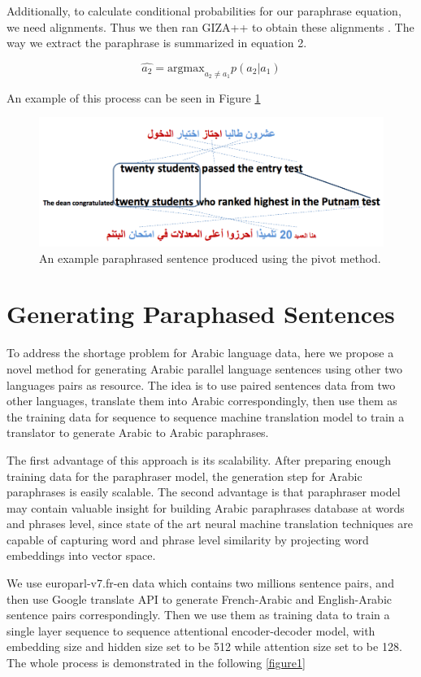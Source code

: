 \documentclass[11pt,letterpaper]{article}
\begin{document}
Additionally, to calculate conditional probabilities for our paraphrase equation, we need alignments. Thus we then ran GIZA++ to obtain these alignments \cite{och03:asc}. The way we extract the paraphrase is summarized in equation 2. 

\begin{equation}
\hat{a_2} = \text{argmax}_{a_2 \neq a_1} p(a_2 | a_1)
\end{equation}

An example of this process can be seen in Figure \ref{fig:pivot}
\begin{figure}
\includegraphics[scale=0.5]{arabic_pivot}
\caption{An example paraphrased sentence produced using the pivot method. }
\label{fig:pivot}
\end{figure}
\section{Generating Paraphased Sentences}
	To address the shortage problem for Arabic language data, here we propose a novel method for generating Arabic parallel language sentences using other two languages pairs as resource. The idea is to use paired sentences data from two other languages, translate them into Arabic correspondingly, then use them as the  training data for sequence to sequence machine translation model to train a translator  to generate Arabic to Arabic paraphrases.
  
	The first advantage of this approach is its scalability. After preparing enough training data for the paraphraser model, the generation step for Arabic paraphrases is easily scalable. The second advantage is that paraphraser model may contain valuable insight for  building Arabic paraphrases database at  words and phrases level, since state of the art neural machine translation techniques are capable of capturing word and phrase level similarity by projecting word embeddings into vector space.
	
	We use europarl-v7.fr-en data which contains two millions sentence pairs, and then use Google translate API to generate French-Arabic and English-Arabic sentence pairs correspondingly. Then we use them as training data to train a single layer sequence to sequence attentional encoder-decoder model, with embedding size and hidden size set to be 512 while attention size set to be 128. The whole process is demonstrated in the following  \ref{figure1}
\end{document}
